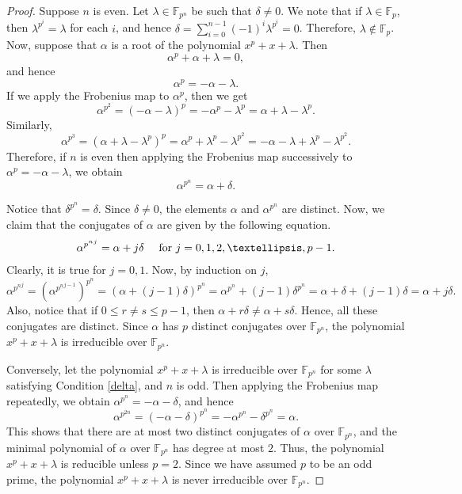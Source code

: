\documentclass[10pt,a4paper]{amsart}
\begin{document}
        \begin{proof}
            
             Suppose $n$ is even. Let $\lambda\in\mathbb{F}_{p^n}$ be such that $\delta\neq 0$. We note that if $\lambda\in\mathbb{F}_p$, then $\lambda^{p^i}=\lambda$ for each $i$, and hence $\delta=\sum_{i=0}^{n-1}(-1)^i\lambda^{p^i}=0$. Therefore, $\lambda\not\in\mathbb{F}_p$. Now, suppose that $\alpha$ is a root of the polynomial $x^p+x+\lambda$. Then
            $$\alpha^p+\alpha+\lambda=0,$$ and hence
            $$\alpha^p=-\alpha-\lambda.$$ 
            If we apply the Frobenius map to $\alpha^p$, then we get 
            $$\alpha^{p^2}=(-\alpha-\lambda)^p=-\alpha^p-\lambda^p=\alpha+\lambda-\lambda^p.$$ 
            Similarly, $$\alpha^{p^3}=(\alpha+\lambda-\lambda^p)^p=\alpha^p+\lambda^p-\lambda^{p^2}=-\alpha-\lambda+\lambda^p-\lambda^{p^2}.$$ 
            Therefore, if $n$ is even then applying the Frobenius map successively to $\alpha^p=-\alpha-\lambda$, we obtain $$\alpha^{p^n}=\alpha+\delta.$$ 
           
            Notice that $\delta^{p^n}=\delta$. Since $\delta\neq 0$, the elements $\alpha$ and $\alpha^{p^n}$ are distinct. Now, we claim that the conjugates of $\alpha$ are given by the following equation. 
            $$\alpha^{{p^n}^j}=\alpha+j\delta \text{  \quad for } j=0,1,2,\ldots,p-1.$$
            Clearly, it is true for $j=0,1$. Now, by induction on $j$, 
            $$\alpha^{{p^n}^j}=(\alpha^{{p^n}^{j-1}})^{p^n}=(\alpha+(j-1)\delta)^{{p^n}}=\alpha^{p^n}+(j-1)\delta^{p^n}=\alpha+\delta+(j-1)\delta=\alpha+j\delta.$$
            Also, notice that if $0\leq r\neq s\leq p-1$, then $\alpha+r\delta\neq \alpha+s\delta$. Hence, all these conjugates are distinct. Since $\alpha$ has $p$ distinct conjugates over $\mathbb{F}_{p^n}$, the polynomial $x^p+x+\lambda$ is irreducible over $\mathbb{F}_{p^n}$.

            Conversely, let the polynomial $x^p+x+\lambda$ is irreducible over $\mathbb{F}_{p^n}$ for some $\lambda$ satisfying Condition \eqref{delta}, and $n$ is odd. Then applying the Frobenius map repeatedly, we obtain $\alpha^{{p^{n}}}=-\alpha-\delta$, and hence $$\alpha^{{p^{2n}}}=(-\alpha-\delta)^{p^n}=-\alpha^{p^n}-\delta^{p^n}=\alpha.$$ 
            This shows that there are at most two distinct conjugates of $\alpha$ over $\mathbb{F}_{p^n}$, and the minimal polynomial of $\alpha$ over $\mathbb{F}_{p^n}$ has degree at most $2$. Thus, the polynomial $x^p+x+\lambda$ is reducible unless $p=2$. Since we have assumed $p$ to be an odd prime, the polynomial $x^p+x+\lambda$ is never irreducible over $\mathbb{F}_{p^n}$.
        \end{proof}
\end{document}

